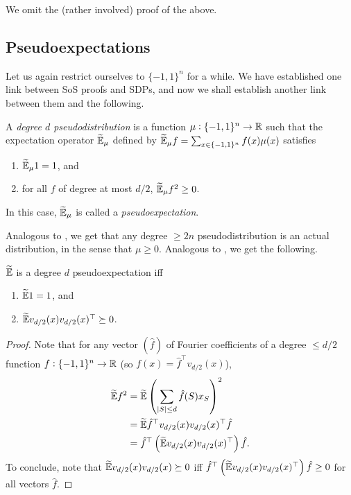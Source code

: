 	We omit the (rather involved) proof of the above.

\subsection{Pseudoexpectations}

	Let us again restrict ourselves to $\{-1,1\}^n$ for a while. We have established one link between SoS proofs and SDPs, and now we shall establish another link between them and the following.

	\begin{fdef}[Pseudodistribution]
		\label{def: pseudodistrib}
		A \emph{degree $d$ pseudodistribution} is a function $\mu : \{-1,1\}^n \to \mathbb{R}$ such that the expectation operator $\widetilde{\mathbb{E}}_{\mu}$ defined by $\widetilde{\mathbb{E}}_{\mu} f = \sum_{x \in \{-1,1\}^n} f(x) \mu(x)$ satisfies
		\begin{enumerate}[label=(\alph*)]
			\item $\widetilde{\mathbb{E}}_\mu 1 = 1$, and
			\item for all $f$ of degree at most $d/2$, $\widetilde{\mathbb{E}}_\mu f^2 \ge 0$.
		\end{enumerate}
		In this case, $\widetilde{\mathbb{E}}_\mu$ is called a \emph{pseudoexpectation}.
	\end{fdef}

	Analogous to , we get that any degree $\ge 2n$ pseudodistribution is an actual distribution, in the sense that $\mu \ge 0$. Analogous to , we get the following.

	\begin{fprop}
		\label{prop: pe-characterization}
		$\widetilde{\mathbb{E}}$ is a degree $d$ pseudoexpectation iff
		\begin{enumerate}[label=(\alph*)]
			\item $\widetilde{\mathbb{E}} 1 = 1$, and
			\item $\widetilde{\mathbb{E}} v_{d/2}(x) v_{d/2}(x)^\top \succeq 0$. 
		\end{enumerate}
	\end{fprop}
	\begin{proof}
		Note that for any vector $(\hat{f})$ of Fourier coefficients of a degree $\le d/2$ function $f : \{-1,1\}^n \to \mathbb{R}$ (so $f(x) = \hat{f}^\top v_{d/2}(x)$),
		\begin{align*}
			\widetilde{\mathbb{E}} f^2 &= \widetilde{\mathbb{E}} \left(\sum_{|S| \le d} \hat{f}(S) x_S\right)^2 \\
				&= \widetilde{\mathbb{E}} \hat{f}^\top v_{d/2}(x) v_{d/2}(x)^\top \hat{f} \\
				&= \hat{f}^\top \left( \widetilde{\mathbb{E}} v_{d/2}(x) v_{d/2}(x)^\top \right) \hat{f}.
		\end{align*}
		To conclude, note that $\widetilde{\mathbb{E}} v_{d/2}(x) v_{d/2}(x) \succeq 0$ iff $\hat{f}^\top \left( \widetilde{\mathbb{E}} v_{d/2}(x) v_{d/2}(x)^\top \right) \hat{f} \ge 0$ for all vectors $\hat{f}$.
	\end{proof}

